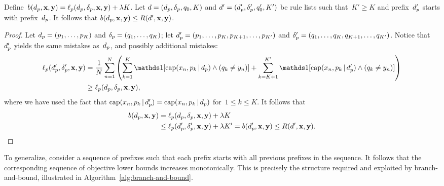 \begin{theorem}
Define~${b(d_p, \mathbf{x}, \mathbf{y}) = \ell_p(d_p, \delta_p, \mathbf{x}, \mathbf{y}) + {\lambda} K}$.
%
Let ${{d} = (d_p, \delta_p, q_0, K)}$ and
${{d}' = (d_p', \delta_p', q_0', K')}$ be rule lists
such that~${K' \ge K}$ and prefix~$d_p'$ starts with
prefix~$d_p$.
%
It follows that ${b(d_p, \mathbf{x}, \mathbf{y}) \le R({d}', \mathbf{x}, \mathbf{y})}$.
\label{thm:bound}
\end{theorem}

\begin{proof}
Let ${d_p = (p_1, \dots, p_K)}$ and ${\delta_p = (q_1, \dots, q_K)}$;
let ${d_p' = (p_1, \dots, p_K, p_{K+1}, \dots, p_{K'})}$
and ${\delta_p' = (q_1, \dots, q_K, q_{K+1}, \dots, q_{K'})}$.
%
Notice that~$d_p'$ yields the same mistakes as~$d_p$,
and possibly additional mistakes:
\begin{align}
\Loss_p(\Prefix', \Labels', \x, \y)
&= \frac{1}{N} \sum_{n=1}^N \left( \sum_{k=1}^K \one [ \Cap(x_n, p_k \given \Prefix) \wedge (q_k \neq y_n) ]
+ \sum_{k=K+1}^{K'} \one [ \Cap(x_n, p_k \given \Prefix') \wedge (q_k \neq y_n) ] \right) \nn \\
&\ge \Loss_p(\Prefix, \Labels, \x, \y),
\label{eq:prefix-loss}
\end{align}
where we have used the fact that
${\textnormal{cap}(x_n, p_k \,|\, d_p') = \textnormal{cap}(x_n, p_k \,|\, d_p)}$
for~${1 \le k \le K}$.
%
It follows that
\begin{align}
b(\Prefix, \x, \y) &= \Loss_p(\Prefix, \Labels, \x, \y) + \Reg K \nn \\
&\le  \Loss_p(\Prefix', \Labels', \x, \y) + \Reg K' = b(\Prefix', \x, \y)
\le \Obj(\RL', \x, \y).
\label{eq:prefix-lb}
\end{align}
\end{proof}

To generalize, consider a sequence of prefixes such that each prefix
starts with all previous prefixes in the sequence.
%
It follows that the corresponding sequence of objective lower bounds
increases monotonically.
%
This is precisely the structure required and exploited by branch-and-bound,
illustrated in Algorithm~\ref{alg:branch-and-bound}.

